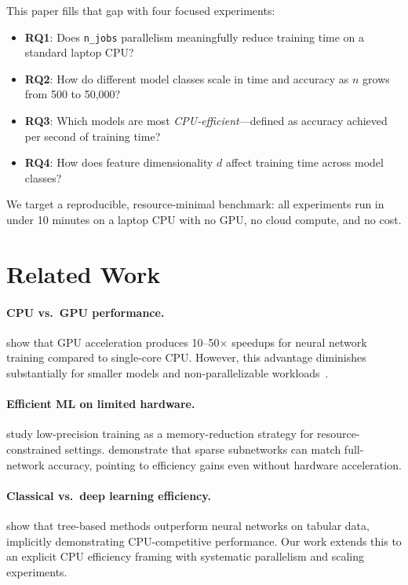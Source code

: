 \documentclass[10pt,twocolumn]{article}
\begin{document}
This paper fills that gap with four focused experiments:

\begin{itemize}[nosep,leftmargin=*]
  \item \textbf{RQ1}: Does \texttt{n\_jobs} parallelism meaningfully reduce training 
        time on a standard laptop CPU?
  \item \textbf{RQ2}: How do different model classes scale in time and accuracy 
        as $n$ grows from 500 to 50,000?
  \item \textbf{RQ3}: Which models are most \textit{CPU-efficient}—defined as 
        accuracy achieved per second of training time?
  \item \textbf{RQ4}: How does feature dimensionality $d$ affect training time across 
        model classes?
\end{itemize}

We target a reproducible, resource-minimal benchmark: all experiments run in 
under 10 minutes on a laptop CPU with no GPU, no cloud compute, and no cost.

\section{Related Work}

\paragraph{CPU vs.\ GPU performance.}
\citet{strigl2010performance} show that GPU acceleration produces 10--50$\times$ 
speedups for neural network training compared to single-core CPU.
However, this advantage diminishes substantially for smaller models and 
non-parallelizable workloads~\citep{raina2009large}.

\paragraph{Efficient ML on limited hardware.}
\citet{gupta2015deep} study low-precision training as a memory-reduction strategy 
for resource-constrained settings.
\citet{frankle2019lottery} demonstrate that sparse subnetworks can match 
full-network accuracy, pointing to efficiency gains even without hardware acceleration.

\paragraph{Classical vs.\ deep learning efficiency.}
\citet{grinsztajn2022tree} show that tree-based methods outperform neural networks 
on tabular data, implicitly demonstrating CPU-competitive performance.
Our work extends this to an explicit CPU efficiency framing with systematic 
parallelism and scaling experiments.
\end{document}
